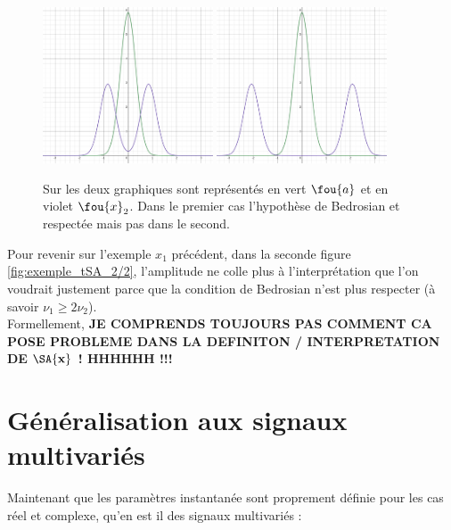 \begin{figure}[h]\centering
	\includegraphics[width=0.45\textwidth]{fig/part-1/bedro condi 1.png} 
	\hfill
	\includegraphics[width=0.45\textwidth]{fig/part-1/bedro condi 2.png} 
	\caption{Sur les deux graphiques sont représentés en vert $\fou{a}$ et en violet $\fou{x}_2$. Dans le premier cas l'hypothèse de Bedrosian et respectée mais pas dans le second.}
	\label{fig:alising-ish}
\end{figure}


Pour revenir sur l'exemple $x_1$ précédent, dans la seconde figure \ref{fig:exemple_tSA_2/2}, l'amplitude ne colle plus à l'interprétation que l'on voudrait justement parce que la condition de Bedrosian n'est plus respecter (à savoir $\nu_1\geq 2\nu_2$). 
\\
Formellement, \textbf{JE COMPRENDS TOUJOURS PAS COMMENT CA POSE PROBLEME DANS LA DEFINITON / INTERPRETATION DE $\bf{\SA{x}}$ ! HHHHHH !!!}
\\



\section{Généralisation aux signaux multivariés}\label{sec:sign_multivar}

Maintenant que les paramètres instantanée sont proprement définie pour les cas réel et complexe, qu'en est il des signaux multivariés :

